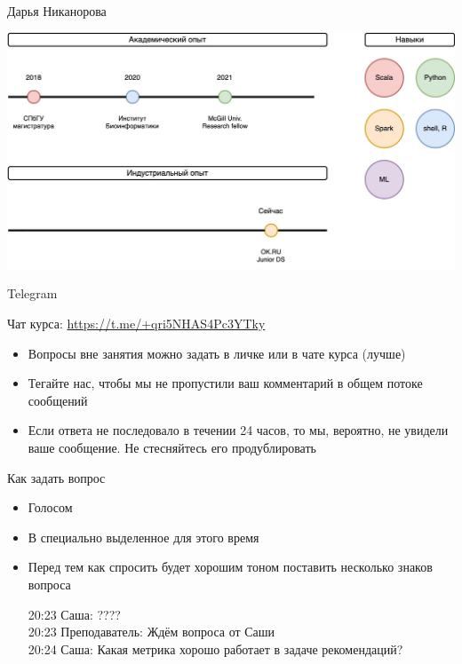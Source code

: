 \documentclass[11pt,aspectratio=169,handout]{beamer}
\begin{document}
\begin{frame}{Дарья Никанорова}

\begin{center}
\includegraphics[scale=0.23]{images/about-me-dasha.jpg}
\end{center}

\end{frame}

\begin{frame}{Telegram}

Чат курса: \url{https://t.me/+qri5NHAS4Pc3YTky}

\vfill

\begin{itemize}
\item Вопросы вне занятия можно задать в личке или в чате курса (лучше)
\item Тегайте нас, чтобы мы не пропустили ваш комментарий в общем потоке сообщений
\item Если ответа не последовало в течении 24 часов, то мы, вероятно, не увидели ваше сообщение. Не стесняйтесь его продублировать
\end{itemize}

\end{frame}

\begin{frame}{Как задать вопрос}

\begin{itemize}
\item Голосом
\item В специально выделенное для этого время
\item Перед тем как спросить будет хорошим тоном поставить несколько знаков вопроса
\begin{tcolorbox}[colback=gray!5,colframe=gray!80,title=]
20:23 Саша: ???? \\
20:23 Преподаватель: Ждём вопроса от Саши \\
20:24 Саша: Какая метрика хорошо работает в задаче рекомендаций?
\end{tcolorbox}
\end{itemize}

\end{frame}
\end{document}
